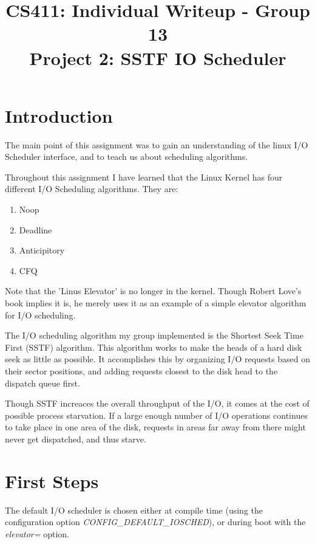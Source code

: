 \documentclass[letterpaper,10pt,titlepage]{article}
\title{CS411: Individual Writeup - Group 13\\
    Project 2: SSTF IO Scheduler}
\author{\name}
\begin{document}
\maketitle

\section*{Introduction}

The main point of this assignment was to gain an understanding of the
linux I/O Scheduler interface, and to teach us about scheduling
algorithms.

Throughout this assignment I have learned that the Linux Kernel 
has four different I/O Scheduling algorithms. They are:
\begin{enumerate}
    \item Noop
    \item Deadline
    \item Anticipitory
    \item CFQ
\end{enumerate}

Note that the 'Linus Elevator' is no longer in the kernel. Though Robert Love's
book implies it is, he merely uses it as an example of a simple elevator
algorithm for I/O scheduling.

The I/O scheduling algorithm my group implemented is the Shortest Seek
Time First (SSTF) algorithm. This algorithm works to make the heads of a
hard disk seek as little as possible. It accomplishes this by organizing
I/O requests based on their sector positions, and adding requests
closest to the disk head to the dispatch queue first.

Though SSTF increaces the overall throughput of the I/O, it comes at the
cost of possible process starvation. If a large enough number of I/O
operations continues to take place in one area of the disk, requests in
areas far away from there might never get dispatched, and thus starve.

\section*{First Steps}

The default I/O scheduler is chosen either at compile time (using the
configuration option \emph{CONFIG\_DEFAULT\_IOSCHED}), or during boot with the
\emph{elevator=} option.
\end{document}
